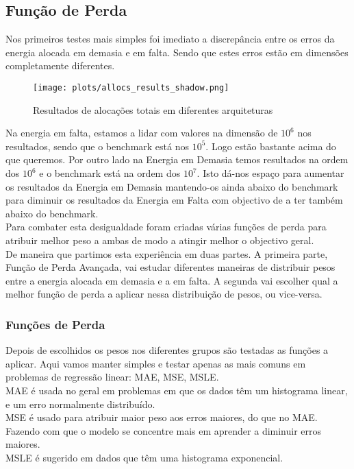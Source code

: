 \subsection{Função de Perda}

Nos primeiros testes mais simples foi imediato a discrepância entre os erros da energia alocada em demasia e em falta. Sendo que estes erros estão em dimensões completamente diferentes.
\begin{figure}[H]
    \centering
    \texttt{[image: plots/allocs\_results\_shadow.png]}
    \caption{Resultados de alocações totais em diferentes arquiteturas}
    \label{fig:resexparchs}
  \end{figure}

Na energia em falta, estamos a lidar com valores na dimensão de $10^{6}$ nos resultados, sendo que o benchmark está nos $10^{5}$. Logo estão bastante acima do que queremos. Por outro lado na Energia em Demasia temos resultados na ordem dos $10^{6}$ e o benchmark está na ordem dos $10^{7}$. Isto dá-nos espaço para aumentar os resultados da Energia em Demasia mantendo-os ainda abaixo do benchmark para diminuir os resultados da Energia em Falta com objectivo de a ter também abaixo do benchmark.\\
Para combater esta desigualdade foram criadas várias funções de perda para atribuir melhor peso a ambas de modo a atingir melhor o objectivo geral.\\
De maneira que partimos esta experiência em duas partes. A primeira parte, Função de Perda Avançada, vai estudar diferentes maneiras de distribuir pesos entre a energia alocada em demasia e a em falta. A segunda vai escolher qual a melhor função de perda a aplicar nessa distribuição de pesos, ou vice-versa.\\


\subsubsection{Funções de Perda}
Depois de escolhidos os pesos nos diferentes grupos são testadas as funções a aplicar. Aqui vamos manter simples e testar apenas as mais comuns em problemas de regressão linear: \gls{MAE}, \gls{MSE}, \gls{MSLE}.\\
\gls{MAE} é usada no geral em problemas em que os dados têm um histograma linear, e um erro normalmente distribuído.\\
\gls{MSE} é usado para atribuir maior peso aos erros maiores, do que no \gls{MAE}. Fazendo com que o modelo se concentre mais em aprender a diminuir erros maiores.\\
\gls{MSLE} é sugerido em dados que têm uma histograma exponencial.\\


